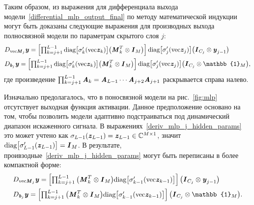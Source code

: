 Таким образом, из выражения для дифференциала выхода модели~\eqref{differential_mlp_output_final} по методу математической индукции могут быть доказаны следующие выражения для производных выхода полносвязной модели по параметрам скрытого слоя $j$:
\begin{align}
	&D_{\text{vec}\bit{M}_{j}}\bit{y}=
	\begin{bmatrix}
		\prod_{k=j+1}^{L-1}\text{diag}\big[\sigma'_{k}(\text{vec}\bit{z}_{k})\big]\big(\bit{M}_{k}^T\otimes\bit{I}_{M}\big)
	\end{bmatrix}
	\text{diag}\big[\sigma'_{j}(\text{vec}\bit{z}_{j})\big]\big(\bit{I}_{C_{j}}\otimes\bit{y}_{j-1}\big) \nonumber \\
	&D_{\bit{b}_{j}}\bit{y}=
	\begin{bmatrix}
		\prod_{k=j+1}^{L-1}\text{diag}\big[\sigma'_{k}(\text{vec}\bit{z}_{k})\big]\big(\bit{M}_{k}^T\otimes\bit{I}_{M}\big)
	\end{bmatrix}
	\text{diag}\big[\sigma'_{j}(\text{vec}\bit{z}_{j})\big]\big(\bit{I}_{C_{j}}\otimes\mathbb{1}_M\big),
	\label{deriv_mlp_j_hidden_params}
\end{align}
где произведение $\prod_{k=j+1}^{L-1}\textbf{\textit{A}}_k=\textbf{\textit{A}}_{L-1}\cdots\textbf{\textit{A}}_{j+2}\textbf{\textit{A}}_{j+1}$ раскрывается справа налево.

Изначально предолагалось, что в поносвязной модели на рис.~\ref{fig:mlp} отсутствует выходная функция активации. Данное предположение основано на том, чтобы позволить модели адаптивно подстраиваться под динамический диапазон искаженного сигнала. В выражениях~\eqref{deriv_mlp_j_hidden_params} это может учтено как $\sigma_{L-1}(\textbf{\textit{z}}_{L-1})=\textbf{\textit{z}}_{L-1}\in\mathbb{C}^{M\times1}$, значит $\text{diag}\big[\sigma'_{L-1}(\textbf{\textit{z}}_{L-1})\big]=\textbf{\textit{I}}_{M}$. В результате, проивзодные~\eqref{deriv_mlp_j_hidden_params} могут быть переписаны в более компактной форме:
\begin{align}
	&D_{\text{vec}\bit{M}_{j}}\bit{y}=
	\begin{bmatrix}
		\prod_{k=j+1}^{L-1}\big(\bit{M}_{k}^T\otimes\bit{I}_{M}\big)\text{diag}\big[\sigma'_{k-1}(\text{vec}\bit{z}_{k-1})\big]
	\end{bmatrix}
	\big(\bit{I}_{C_{j}}\otimes\bit{y}_{j-1}\big) \nonumber \\
	&D_{\bit{b}_{j}}\bit{y}=
	\begin{bmatrix}
		\prod_{k=j+1}^{L-1}\big(\bit{M}_{k}^T\otimes\bit{I}_{M}\big)\text{diag}\big[\sigma'_{k-1}(\text{vec}\bit{z}_{k-1})\big]
	\end{bmatrix}
	\big(\bit{I}_{C_{j}}\otimes\mathbb{1}_M\big).
	\label{deriv_mlp_j_hidden_params_simplified}
\end{align}

